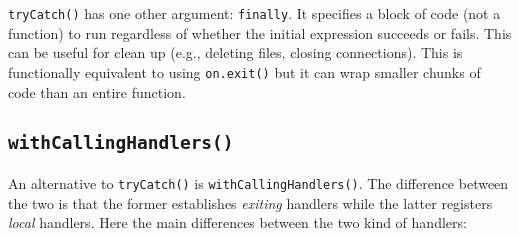 \texttt{tryCatch()} has one other argument: \texttt{finally}. It
specifies a block of code (not a function) to run regardless of whether
the initial expression succeeds or fails. This can be useful for clean
up (e.g., deleting files, closing connections). This is functionally
equivalent to using \texttt{on.exit()} but it can wrap smaller chunks of
code than an entire function. 

\hypertarget{withcallinghandlers}{%
\subsection{\texorpdfstring{\texttt{withCallingHandlers()}}{withCallingHandlers()}}\label{withcallinghandlers}}

An alternative to \texttt{tryCatch()} is \texttt{withCallingHandlers()}.
The difference between the two is that the former establishes
\emph{exiting} handlers while the latter registers \emph{local}
handlers. Here the main differences between the two kind of handlers:

